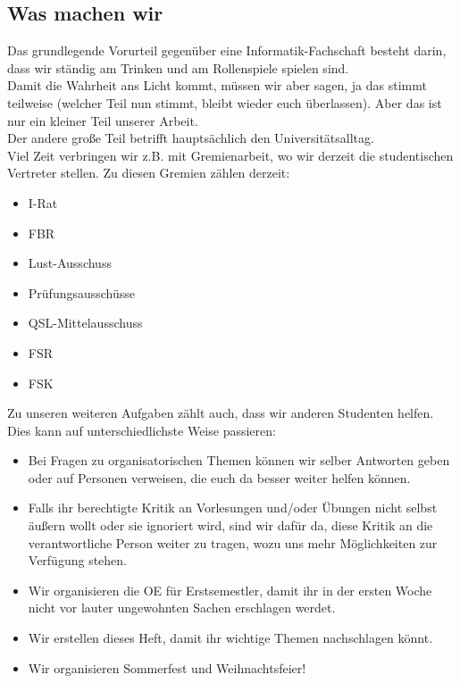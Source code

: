 \documentclass[12pt,a4paper]{article}
\begin{document}
	\subsection{Was machen wir}
		Das grundlegende Vorurteil gegenüber eine Informatik-Fachschaft besteht darin, dass wir ständig am Trinken und am Rollenspiele spielen sind. \\
		Damit die Wahrheit ans Licht kommt, müssen wir aber sagen, ja das stimmt teilweise (welcher Teil nun stimmt, bleibt wieder euch überlassen). Aber das ist nur ein kleiner Teil unserer Arbeit.\\
		Der andere große Teil betrifft hauptsächlich den Universitätsalltag.\\ Viel Zeit verbringen wir z.B. mit Gremienarbeit, wo wir derzeit die studentischen Vertreter stellen. Zu diesen Gremien zählen derzeit:
		\begin{itemize}
			\item I-Rat
			\item FBR
			\item Lust-Ausschuss
			\item Prüfungsausschüsse
			\item QSL-Mittelausschuss
			\item FSR
			\item FSK	
		\end{itemize}
		Zu unseren weiteren Aufgaben zählt auch, dass wir anderen Studenten helfen. Dies kann auf unterschiedlichste Weise passieren:
		\begin{itemize}
			\item Bei Fragen zu organisatorischen Themen können wir selber Antworten geben oder auf Personen verweisen, die euch da besser weiter helfen können.
			\item Falls ihr berechtigte Kritik an Vorlesungen und/oder Übungen nicht selbst äußern wollt oder sie ignoriert wird, sind wir dafür da, diese Kritik an die verantwortliche Person weiter zu tragen, wozu uns mehr Möglichkeiten zur Verfügung stehen.
			\item Wir organisieren die OE für Erstsemestler, damit ihr in der ersten Woche nicht vor lauter ungewohnten Sachen erschlagen werdet.
			\item Wir erstellen dieses Heft, damit ihr wichtige Themen nachschlagen könnt.
			\item Wir organisieren Sommerfest und Weihnachtsfeier!
		\end{itemize}
		
\end{document}
